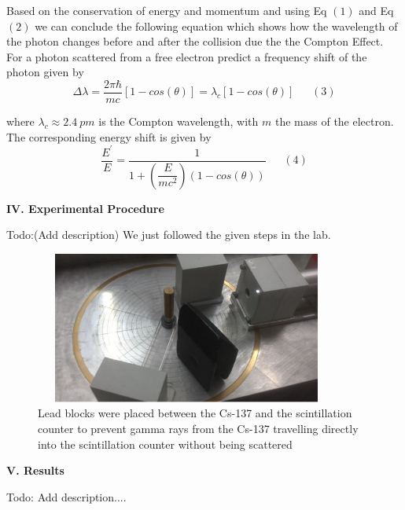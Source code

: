 \documentclass[fleqn]{article}
\begin{document}
  \vspace{15px}

  Based on the conservation of energy and momentum and using Eq $(1)$ and Eq $(2)$ we can conclude the following equation which shows
  how the wavelength of the photon changes before and after the collision due the the Compton Effect. For a photon scattered from
  a free electron predict a frequency shift of the photon given by
  $$\Delta \lambda=\dfrac{2 \pi \hbar}{mc} \left[1-cos(\theta)\right]=\lambda_c \left[1-cos(\theta)\right]  ~~~~~~~ (3)$$

  where $\lambda_c \approx 2.4 ~ pm$ is the Compton wavelength, with $m$ the mass of the electron. The corresponding energy shift is given by
  $$\dfrac{E^'}{E}=\dfrac{1}{1+\left(\dfrac{E}{mc^2}\right)\left(1-cos (\theta)\right)} ~~~~~~~ (4)$$

  \vspace{10px}

  \textbf{IV. Experimental Procedure}

  \vspace{10px}

  Todo:(Add description) We just followed the given steps in the lab.


  \begin{figure}[htbp]
    \includegraphics[height=5cm, width=10cm]{Two.JPG}
    \caption{
      Lead blocks were placed between the Cs-137 and the scintillation counter to prevent gamma rays from the
      Cs-137 travelling directly into the scintillation counter without being scattered
    }
  \end{figure}

  \pagebreak

  \textbf{V. Results}

  Todo: Add description....

  \vspace{10px}
\end{document}
